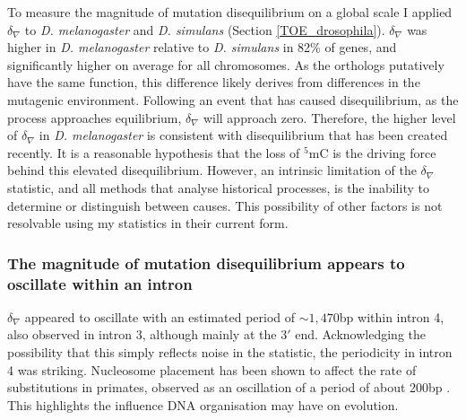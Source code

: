 To measure the magnitude of mutation disequilibrium on a global scale I applied $\delta_\nabla$ to \textit{D. melanogaster} and \textit{D. simulans} (Section \ref{TOE_drosophila}). $\delta_\nabla$ was higher in \textit{D. melanogaster} relative to \textit{D. simulans} in 82\% of genes, and significantly higher on average for all chromosomes. As the orthologs putatively have the same function, this difference likely derives from differences in the mutagenic environment. Following an event that has caused disequilibrium, as the process approaches equilibrium, $\delta_\nabla$ will approach zero. Therefore, the higher level of $\delta_\nabla$ in \textit{D. melanogaster} is consistent with disequilibrium that has been created recently. It is a reasonable hypothesis that the loss of $^5$mC is the driving force behind this elevated disequilibrium. However, an intrinsic limitation of the $\delta_\nabla$ statistic, and all methods that analyse historical processes, is the inability to determine or distinguish between causes. This possibility of other factors is not resolvable using my statistics in their current form. 



\subsubsection{The magnitude of mutation disequilibrium appears to oscillate within an intron}

$\delta_\nabla$ appeared to oscillate with an estimated period of $\sim1,470$bp within intron 4, also observed in intron 3, although mainly at the $3'$ end. Acknowledging the possibility that this simply reflects noise in the statistic, the periodicity in intron 4 was striking. Nucleosome placement has been shown to affect the rate of substitutions in primates, observed as an oscillation of a period of about 200bp \citep{Ying2010EvidenceRepair}. This highlights the influence DNA organisation may have on evolution. 

